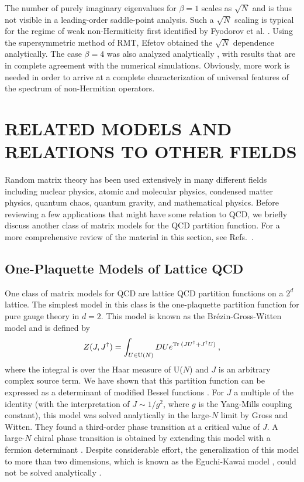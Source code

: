 The number of purely imaginary eigenvalues for $\beta = 1$ scales as
$\sqrt N$ and is thus not visible in a leading-order saddle-point
analysis.  Such a $\sqrt N$ scaling is typical for the regime of weak
non-Hermiticity first identified by Fyodorov et al.
{\cite{fyodorov}}.  Using the supersymmetric method of RMT,
Efetov {\cite{Efetovnh}} obtained the $\sqrt N$ dependence
analytically.  The case $\beta=4$ was also analyzed analytically
\cite{efetovsym}, with results that are in complete agreement with
the numerical simulations.  Obviously, more work is needed in
order to arrive at a complete characterization of universal features
{\cite{fyodorovpoly}} of the spectrum of non-Hermitian operators.



\section{RELATED MODELS AND RELATIONS TO OTHER \mbox{FIELDS}}
\label{otherfields}

Random matrix theory has been used extensively in many different
fields including nuclear physics, atomic and molecular physics,
condensed matter physics, quantum chaos, quantum gravity, and
mathematical physics.  Before reviewing a few applications that might
have some relation to QCD, we briefly discuss another class of matrix
models for the QCD partition function.  For a more comprehensive
review of the material in this section, see
Refs.~\cite{Guhr98,Beenreview,Montambaux,eeee,mironov}.

\subsection{One-Plaquette Models of Lattice QCD}

One class of matrix models for QCD are lattice QCD partition functions
on a $2^d$ lattice. The simplest model in this class is the
one-plaquette partition function for pure gauge theory in $d=2$. This 
model is known as the Br\'ezin-Gross-Witten model \cite{GW} and is
defined by
\begin{equation}
  Z(J,J^\dagger) = \int_{U \in {\rm U}(N)} DU e^{{\rm Tr\:} (JU^\dagger
  +J^\dagger U)}\:, 
\end{equation}
where the integral is over the Haar measure of U($N$) and $J$ is an
arbitrary complex source term. We have shown that this
partition function can be expressed as a determinant of modified
Bessel functions \cite{brower,Leut92,seneru}. For $J$ a multiple of
the identity (with the interpretation of $J\sim1/g^2$, where $g$ is
the Yang-Mills coupling constant), this model was solved analytically
in the large-$N$ limit by Gross and Witten.  They found a third-order
phase transition at a critical value of $J$. A large-$N$ chiral phase
transition is obtained by extending this model with a fermion
determinant \cite{Chanran}.  Despite considerable effort, the
generalization of this model to more than two dimensions, which is
known as the Eguchi-Kawai model \cite{EK}, could not be solved
analytically \cite{Das}.


